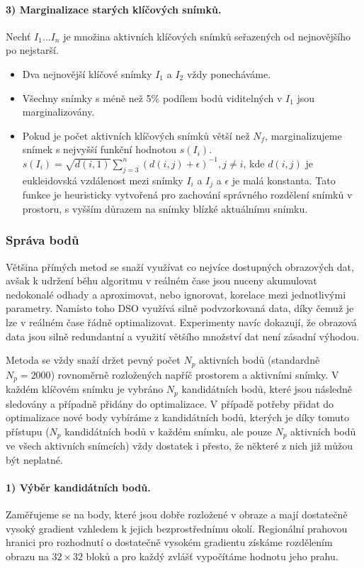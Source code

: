 \documentclass[12pt,a4paper]{article}
\begin{document}
\paragraph*{3) Marginalizace starých klíčových snímků.} Nechť \( I_1 \dots I_n \) je množina aktivních klíčových snímků seřazených od nejnovějšího po nejstarší.
\begin{itemize}
\item Dva nejnovější klíčové snímky \( I_1 \) a \( I_2 \) vždy ponecháváme.
\item Všechny snímky s méně než 5\% podílem bodů viditelných v \( I_1 \) jsou marginalizovány.
\item Pokud je počet aktivních klíčových snímků větší než \( N_f \), marginalizujeme snímek s nejvyšší funkční hodnotou \( s(I_i) \). \( s(I_i)=\sqrt{d(i,1)} \sum_{j=3}^n (d(i,j)+\epsilon)^{-1}, j\neq i \), kde \( d(i,j) \) je eukleidovská vzdálenost mezi snímky \( I_i \) a \( I_j \) a \( \epsilon \) je  malá konstanta. Tato funkce je heuristicky vytvořená pro zachování správného rozdělení snímků v prostoru, s vyšším důrazem na snímky blízké aktuálnímu snímku.
\end{itemize}

\subsubsection*{Správa bodů}
Většina přímých metod se snaží využívat co nejvíce dostupných obrazových dat, avšak k udržení běhu algoritmu v reálném čase jsou nuceny akumulovat nedokonalé odhady a aproximovat, nebo ignorovat, korelace mezi jednotlivými parametry. Namísto toho DSO využívá silně podvzorkovaná data, díky čemuž je lze v reálném čase řádně optimalizovat. Experimenty navíc dokazují, že obrazová data jsou silně redundantní a využití většího množství dat není zásadní výhodou. 

Metoda se vždy snaží držet pevný počet \( N_p \) aktivních bodů (standardně \( N_p = 2000 \)) rovnoměrně rozložených napříč prostorem a aktivními snímky. V každém klíčovém snímku je vybráno \( N_p \) kandidátních bodů, které jsou následně sledovány a případně přidány do optimalizace. V případě potřeby přidat do optimalizace nové body vybíráme z kandidátních bodů, kterých je díky tomuto přístupu (\( N_p \) kandidátních bodů v každém snímku, ale pouze \( N_p \) aktivních bodů ve všech aktivních snímcích) vždy dostatek i přesto, že některé z nich již můžou být neplatné.

\paragraph*{1) Výběr kandidátních bodů.} Zaměřujeme se na body, které jsou dobře rozložené v obraze a mají dostatečně vysoký gradient vzhledem k jejich bezprostřednímu okolí. Regionální prahovou hranici pro rozhodnutí o dostatečně vysokém gradientu získáme rozdělením obrazu na \( 32 \times 32 \) bloků a pro každý zvlášť vypočítáme hodnotu jeho prahu.
\end{document}
